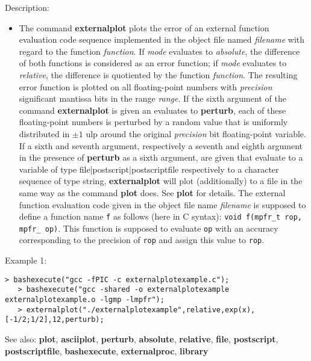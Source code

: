 \noindent Description: \begin{itemize}

\item The command \textbf{externalplot} plots the error of an external function
   evaluation code sequence implemented in the object file named
   \emph{filename} with regard to the function \emph{function}.  If \emph{mode}
   evaluates to \emph{absolute}, the difference of both functions is
   considered as an error function; if \emph{mode} evaluates to \emph{relative},
   the difference is quotiented by the function \emph{function}. The resulting
   error function is plotted on all floating-point numbers with
   \emph{precision} significant mantissa bits in the range \emph{range}. 
   If the sixth argument of the command \textbf{externalplot} is given an evaluates to
   \textbf{perturb}, each of these floating-point numbers is perturbed by a
   random value that is uniformly distributed in $\pm1$ ulp
   around the original \emph{precision} bit floating-point variable.
   If a sixth and seventh argument, respectively a seventh and eighth
   argument in the presence of \textbf{perturb} as a sixth argument, are given
   that evaluate to a variable of type \textsf{file|postscript|postscriptfile} respectively to a
   character sequence of type \textsf{string}, \textbf{externalplot} will plot
   (additionally) to a file in the same way as the command \textbf{plot}
   does. See \textbf{plot} for details.
   The external function evaluation code given in the object file name
   \emph{filename} is supposed to define a function name \texttt{f} as
   follows (here in C syntax): \texttt{void f(mpfr\_t rop, mpfr\_ op)}. 
   This function is supposed to evaluate \texttt{op} with an accuracy corresponding
   to the precision of \texttt{rop} and assign this value to
   \texttt{rop}.
\end{itemize}
\noindent Example 1: 
\begin{center}\begin{minipage}{14.8cm}\begin{Verbatim}[frame=single]
   > bashexecute("gcc -fPIC -c externalplotexample.c");
   > bashexecute("gcc -shared -o externalplotexample externalplotexample.o -lgmp -lmpfr");
   > externalplot("./externalplotexample",relative,exp(x),[-1/2;1/2],12,perturb);
\end{Verbatim}
\end{minipage}\end{center}
See also: \textbf{plot}, \textbf{asciiplot}, \textbf{perturb}, \textbf{absolute}, \textbf{relative}, \textbf{file}, \textbf{postscript}, \textbf{postscriptfile}, \textbf{bashexecute}, \textbf{externalproc}, \textbf{library}
